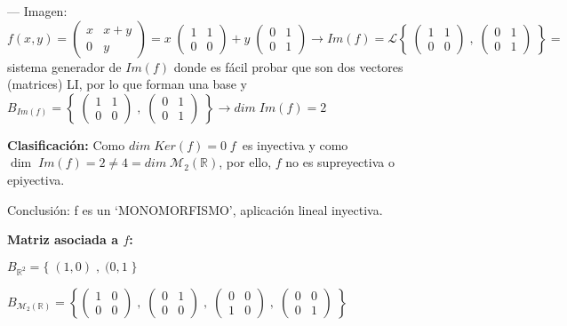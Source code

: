 \begin{proofw}
\noindent \normalsize{--- Imagen:} $f(x,y)=\left( \begin{matrix} x&x+y\\0&y \end{matrix} \right)= x \; \left( \begin{matrix} 1&1\\0&0 \end{matrix} \right) + y \; \left( \begin{matrix} 0&1\\0&1 \end{matrix} \right) \to Im(f)= \mathcal L \left\{\;  \left( \begin{matrix} 1&1\\0&0 \end{matrix} \right)\; , \; \left( \begin{matrix} 0&1\\0&1 \end{matrix} \right)\;  \right\} =$ sistema generador de $Im(f)$ donde es fácil probar que son dos vectores (matrices) LI, por lo que forman una base y $B_{Im(f)}= \left\{\;  \left( \begin{matrix} 1&1\\0&0 \end{matrix} \right)\; , \; \left( \begin{matrix} 0&1\\0&1 \end{matrix} \right)\;  \right\} \to dim \; Im(f)=2$

\noindent \textcolor{gris}{\textbf{ Clasificación:}} Como $dim\; Ker(f)=0\; f \, $ es inyectiva y como $\dim \; Im(f)=2\neq 4 = dim\; \mathcal M_2(\mathbb R)$, por ello, $f$ no es supreyectiva o epiyectiva. 

\noindent Conclusión: f es un `MONOMORFISMO', aplicación lineal inyectiva.

\noindent \textcolor{gris}{\textbf{ Matriz asociada a $f$:}}

\noindent $B_{\mathbb R^2}= \{ \; (1,0)\;,\;(0,1\;\}$

\noindent $B_{\mathcal M_2(\mathbb R)}= \left\{
\left( \begin{matrix} 1&0\\0&0 \end{matrix} \right)\; , \;
\left( \begin{matrix} 0&1\\0&0 \end{matrix} \right)\; , \;
\left( \begin{matrix} 0&0\\1&0 \end{matrix} \right)\; , \;
\left( \begin{matrix} 0&0\\0&1 \end{matrix} \right) \;
\right\}$


\end{proofw}
